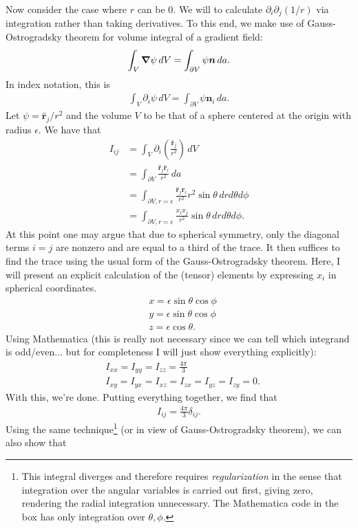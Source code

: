 \documentclass{article}
\theoremstyle{definition}
\newcommand{\p}{\partial}
\newcommand{\f}[2]{\frac{#1}{#2}}
\newcommand{\lp}{\left(}
\newcommand{\rp}{\right)}
\begin{document}
\begin{enumerate}[label=(\alph*)]
	
	Now consider the case where $r$ can be $0$. We will to calculate $\p_i \p_j (1/r)$ via integration rather than taking derivatives. To this end, we make use of Gauss-Ostrogradsky theorem for volume integral of a gradient field:
	\begin{align*}
	\int_V \grad \psi \,dV = \int_{\p V} \psi \bm{n} \,da.
	\end{align*}
	In index notation, this is 
	\begin{align*}
	\int_V \p_i \psi \,dV = \int_{\p V} \psi \bm{n}_i \,da.
	\end{align*}
	Let $\psi = \hat{\bm{r}}_j / r^2$ and the volume $V$ to be that of a sphere centered at the origin with radius $\epsilon$. We have that
	\begin{align*}
	I_{ij} &= \int_V  \p_i \lp \f{\hat{\bm{r}}_j}{r^2}\rp \,dV \\
	&= \int_{\p V} \f{\hat{\bm{r}}_j \hat{\bm{r}}_i }{r^2} \,da \\
	&= \int_{\p V, r=\epsilon} \f{\hat{\bm{r}}_j  \hat{\bm{r}}_i }{r^2}r^2\sin\theta\,dr d\theta d\phi\\
	&= \int_{\p V, r=\epsilon} \f{x_i x_j}{r^2}\sin\theta\,dr d\theta d\phi.
	\end{align*}
	At this point one may argue that due to spherical symmetry, only the diagonal terms $i=j$ are nonzero and are equal to a third of the trace. It then suffices to find the trace using the usual form of the Gauss-Ostrogradsky theorem. Here, I will present an explicit calculation of the (tensor) elements by expressing $x_i$ in spherical coordinates. 
	\begin{align*}
	&x = \epsilon\sin\theta\cos\phi \\
	&y = \epsilon\sin\theta\cos\phi\\
	&z = \epsilon\cos\theta.
	\end{align*}
	Using Mathematica (this is really not necessary since we can tell which integrand is odd/even... but for completeness I will just show everything explicitly):
	\begin{align*}
	&I_{xx} = I_{yy} = I_{zz} = \f{4\pi}{3} \\
	&I_{xy} = I_{yx} = I_{xz} = I_{zx} = I_{yz} = I_{zy} = 0.
	\end{align*}
	With this, we're done. Putting everything together, we find that
	\begin{align*}
	I_{ij} = \f{4\pi}{3}\delta_{ij}.
	\end{align*}
	Using the same technique\footnote{This integral diverges and therefore requires \textit{regularization} in the sense that integration over the angular variables is carried out first, giving zero, rendering the radial integration unnecessary. The Mathematica code in the box has only integration over $\theta,\phi$.} (or in view of Gauss-Ostrogradsky theorem), we can also show that 

\end{enumerate}
\end{document}
